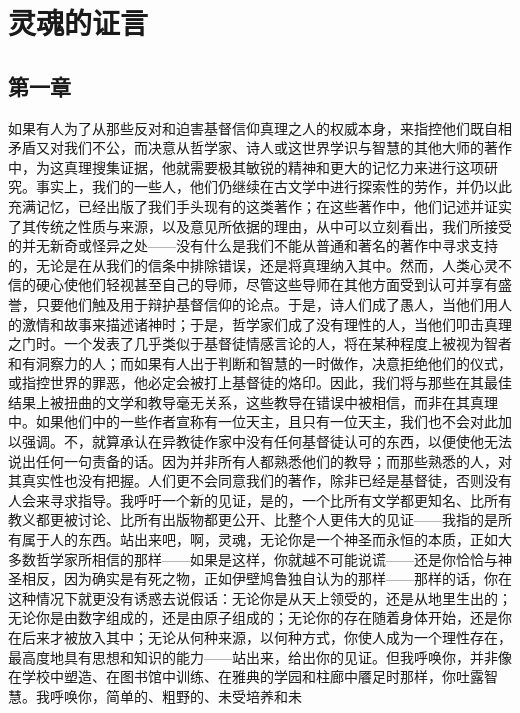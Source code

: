 
\chapter{灵魂的证言}



\section{第一章}

如果有人为了从那些反对和迫害基督信仰真理之人的权威本身，来指控他们既自相矛盾又对我们不公，而决意从哲学家、诗人或这世界学识与智慧的其他大师的著作中，为这真理搜集证据，他就需要极其敏锐的精神和更大的记忆力来进行这项研究。事实上，我们的一些人，他们仍继续在古文学中进行探索性的劳作，并仍以此充满记忆，已经出版了我们手头现有的这类著作；在这些著作中，他们记述并证实了其传统之性质与来源，以及意见所依据的理由，从中可以立刻看出，我们所接受的并无新奇或怪异之处——没有什么是我们不能从普通和著名的著作中寻求支持的，无论是在从我们的信条中排除错误，还是将真理纳入其中。然而，人类心灵不信的硬心使他们轻视甚至自己的导师，尽管这些导师在其他方面受到认可并享有盛誉，只要他们触及用于辩护基督信仰的论点。于是，诗人们成了愚人，当他们用人的激情和故事来描述诸神时；于是，哲学家们成了没有理性的人，当他们叩击真理之门时。一个发表了几乎类似于基督徒情感言论的人，将在某种程度上被视为智者和有洞察力的人；而如果有人出于判断和智慧的一时做作，决意拒绝他们的仪式，或指控世界的罪恶，他必定会被打上基督徒的烙印。因此，我们将与那些在其最佳结果上被扭曲的文学和教导毫无关系，这些教导在错误中被相信，而非在其真理中。如果他们中的一些作者宣称有一位天主，且只有一位天主，我们也不会对此加以强调。不，就算承认在异教徒作家中没有任何基督徒认可的东西，以便使他无法说出任何一句责备的话。因为并非所有人都熟悉他们的教导；而那些熟悉的人，对其真实性也没有把握。人们更不会同意我们的著作，除非已经是基督徒，否则没有人会来寻求指导。我呼吁一个新的见证，是的，一个比所有文学都更知名、比所有教义都更被讨论、比所有出版物都更公开、比整个人更伟大的见证——我指的是所有属于人的东西。站出来吧，啊，灵魂，无论你是一个神圣而永恒的本质，正如大多数哲学家所相信的那样——如果是这样，你就越不可能说谎——还是你恰恰与神圣相反，因为确实是有死之物，正如伊壁鸠鲁独自认为的那样——那样的话，你在这种情况下就更没有诱惑去说假话：无论你是从天上领受的，还是从地里生出的；无论你是由数字组成的，还是由原子组成的；无论你的存在随着身体开始，还是你在后来才被放入其中；无论从何种来源，以何种方式，你使人成为一个理性存在，最高度地具有思想和知识的能力——站出来，给出你的见证。但我呼唤你，并非像在学校中塑造、在图书馆中训练、在雅典的学园和柱廊中餍足时那样，你吐露智慧。我呼唤你，简单的、粗野的、未受培养和未